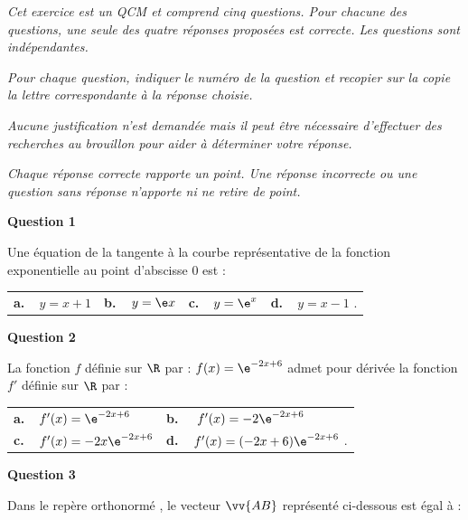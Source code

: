 \medskip

\emph{Cet exercice est un QCM et comprend cinq questions. Pour chacune des questions, une seule
des quatre réponses proposées est correcte. Les questions sont indépendantes.}

\emph{Pour chaque question, indiquer le numéro de la question et recopier sur la copie la lettre
correspondante à la réponse choisie.}

\emph{Aucune justification n'est demandée mais il peut être nécessaire d'effectuer des recherches
au brouillon pour aider à déterminer votre réponse.}

\emph{Chaque réponse correcte rapporte un point. Une réponse incorrecte ou une question sans
réponse n'apporte ni ne retire de point.}

\medskip

\textbf{Question 1}

\medskip

Une équation de la tangente à la courbe représentative de la fonction exponentielle au point
d'abscisse 0 est :

\begin{tabularx}{\linewidth}{*{4}{X}}
\textbf{a.~~}$y=x+1$  &\textbf{b.~~}$y=\e x$ &\textbf{c.~~$y=\e^x $}& \textbf{d.~~}$y= x-1 $ .
\end{tabularx}

\smallskip

\textbf{Question 2}

\medskip

La fonction $f$ définie sur $\R$ par : $f(x) = \e^{-2x+6}$ admet pour dérivée la fonction $f'$ définie
sur $\R$ par :
\begin{tabularx}{\linewidth}{*{2}{X}}
\textbf{a.~~}$f'(x) = \e^{-2x+6}$  &\textbf{b.~~} $f'(x) = -2\e^{-2x+6}$\\\textbf{c.~~}$f'(x) = -2x\e^{-2x+6}$& \textbf{d.~~}$f'(x) = (-2x + 6)\e^{-2x+6}$ .
\end{tabularx}

\medskip

\textbf{Question 3}

\medskip
Dans le repère orthonormé \Oij, le vecteur $\vv{AB}$ représenté ci-dessous est égal à :

